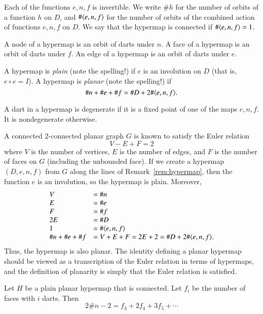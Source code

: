 Each of the functions $e,n,f$ is invertible.  We write $\#h$ for the
number of orbits of a function $h$ on $D$, and $\#\langle e,n,f\rangle$
for the number of orbits of the combined action of functions $e,n,f$
on $D$.  We say that the hypermap is connected if $\#\langle e,n,f\rangle
= 1$.

\begin{definition}  A node of a hypermap is an orbit of darts under
$n$.  A face of a hypermap is an  orbit of darts under $f$.  An edge
of a hypermap is an orbit of darts under $e$.
\end{definition}

\begin{definition} A hypermap is {\it plain} (note the spelling!) if
$e$ is an involution on $D$ (that is, $e\circ e = I$).  A hypermap
is {\it planar} (note the spelling!) if
    $$\# n + \# e + \# f = \# D + 2 \#\langle e,n,f\rangle.$$
\end{definition}

\begin{definition} A dart in a hypermap is degenerate if it is a
fixed point of one of the maps $e,n,f$.  It is nondegenerate
otherwise.
\end{definition}

\begin{example*}  A connected $2$-connected
planar graph $G$ is known to satisfy the Euler relation
    $$ V - E + F = 2$$
where $V$ is the number of vertices, $E$ is the number of edges, and
$F$ is the number of faces on $G$ (including the unbounded face). If
we create a hypermap $(D,e,n,f)$ from $G$ along the lines of
Remark~\ref{rem:hypermap}, then the function $e$ is an involution,
so the hypermap is plain. Moreover,
    $$\begin{array}{lll}
    V &= \# n\\
    E &= \# e\\
    F &= \# f\\
    2E &= \# D\\
    1 &= \#\langle e,n,f\rangle\\
    \# n + \#e + \# f &= V + E + F = 2 E + 2 = \# D + 2 \#\langle e,n,f\rangle.
    \end{array}
    $$
Thus, the hypermap is also planar.  The identity defining a planar
hypermap should be viewed as a transcription of the Euler relation
in terms of hypermaps, and the definition of planarity is simply
that the Euler relation is satisfied.
\end{example*}

\begin{lemma}  Let $H$ be a plain planar hypermap that is connected.
Let $f_i$ be the number of faces with $i$ darts.  Then
    $$2 \# n - 2 =  f_3 + 2 f_4 + 3 f_5 +\cdots$$
\end{lemma}

